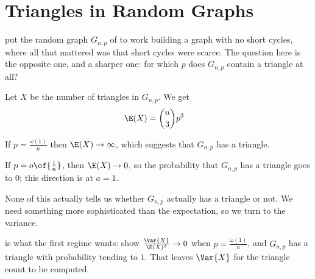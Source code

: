 \section{Triangles in Random Graphs}

 put the random graph $G_{n, p}$ of  to work building a graph with no short cycles, where all that mattered was that short cycles were scarce. The question here is the opposite one, and a sharper one: for which $p$ does $G_{n, p}$ contain a triangle at all?

Let $X$ be the number of triangles in $G_{n, p}$. We get
\begin{align*}
    \E(X) &= \binom{n}{3} p^3
\end{align*}

If $p = \frac{\omega(1)}{n}$ then $\E(X) \to \infty$, which suggests that $G_{n, p}$ has a triangle.

If $p = o\of{\frac{1}{n}}$, then $\E(X) \to 0$, so the probability that $G_{n, p}$ has a triangle goes to $0$; this direction is  at $a = 1$.

None of this actually tells us whether $G_{n, p}$ actually has a triangle or not. We need something more sophisticated than the expectation, so we turn to the variance.

 is what the first regime wants: show $\frac{\Var{X}}{\E(X)^2} \to 0$ when $p = \frac{\omega(1)}{n}$, and $G_{n, p}$ has a triangle with probability tending to $1$. That leaves $\Var{X}$ for the triangle count to be computed. \sorry
